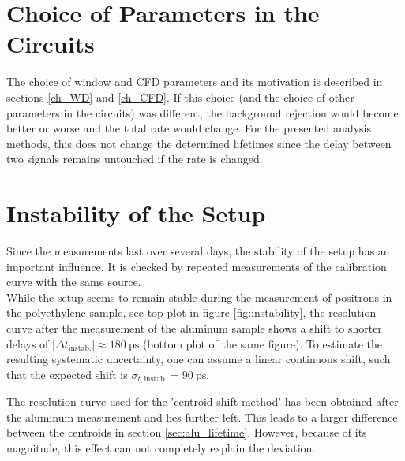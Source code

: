 \documentclass[
	paper=A4,
	parskip=full,
	chapterprefix=true,
	11pt,
	headings=normal,
	bibliography=totoc,
	listof=totoc,
	titlepage=on,
]{scrreprt}
\begin{document}
\section{Choice of Parameters in the Circuits}
The choice of window and CFD parameters and its motivation is described in sections \ref{ch_WD} and \ref{ch_CFD}. If this choice (and the choice of other parameters in the circuits) was different, the background rejection would become better or worse and the total rate would change. For the presented analysis methods, this does not change the determined lifetimes since the delay between two signals remains untouched if the rate is changed. 

\section{Instability of the Setup}
Since the measurements last over several days, the stability of the setup has an important influence. It is checked by repeated measurements of the calibration curve with the same  source.\\
While the setup seems to remain stable during the measurement of positrons in the polyethylene sample, see top plot in figure \ref{fig:instability}, the resolution curve after the measurement of the aluminum sample shows a shift to shorter delays of $|\Delta t_\textrm{instab.} | \approx \SI{180}{\pico\second}$ (bottom plot of the same figure). To estimate the resulting systematic uncertainty, one can assume a linear continuous shift, such that the expected shift is $\sigma_{t, \mathrm{instab.}} = \SI{90}{\pico\second}$.

The resolution curve used for the 'centroid-shift-method' has been obtained after the aluminum measurement and lies further left. This leads to a larger difference between the centroids in section \ref{sec:alu_lifetime}.
However, because of its magnitude, this effect can not completely explain the deviation.
\end{document}
